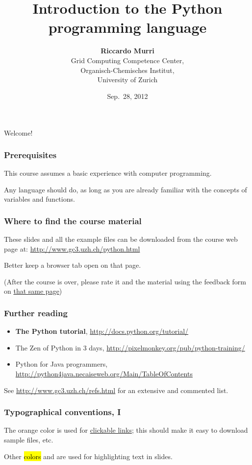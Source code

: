 \documentclass[english,serif,mathserif,xcolor=pdftex,dvipsnames,table]{beamer}
\title[Introduction]{%
  Introduction to the Python programming language
}
\author[R. Murri]{%
  \textbf{Riccardo Murri} \\
  Grid Computing Competence Center, \\
  Organisch-Chemisches Institut, \\
  University of Zurich
}
\date{Sep.~28, 2012}
\begin{document}
\maketitle

\begin{frame}
  \begin{center}
    {\Huge Welcome!}
  \end{center}
\end{frame}


\begin{frame}
  \frametitle{Prerequisites}
  This course assumes a basic experience with computer programming.

  \+ 
  Any language should do, as long as you are already familiar with
  the concepts of variables and functions.
\end{frame}


\begin{frame}
  \frametitle{Where to find the course material}

  These slides and all the example files can be downloaded from the
  course web page at: 
  {\small\url{http://www.gc3.uzh.ch/python.html}}

  \+
  Better keep a browser tab open on that page.

  \+ 
  (After the course is over, please rate it and the material using
  the feedback form on \href{http://www.gc3.uzh.ch/python.html}{that
    same page})
\end{frame}


\begin{frame}
  \frametitle{Further reading} 

  \begin{itemize}
    \item \textbf{The Python tutorial},
      {\small \url{http://docs.python.org/tutorial/}}
    \item {The Zen of Python in 3 days},
      {\small \url{http://pixelmonkey.org/pub/python-training/}}
    \item {Python for Java programmers}, 
      {\small \url{http://python4java.necaiseweb.org/Main/TableOfContents}}
  \end{itemize}

  \+
  See {\small\url{http://www.gc3.uzh.ch/refs.html}}
  for an extensive and commented list.

\end{frame}


\begin{frame}
  \frametitle{Typographical conventions, I}

  The orange color is used for
  \href{http://www.gc3.uzh.ch/python.html}{clickable
    links}; this should make it easy to download sample files, etc.

  \+ 
  Other \hl{colors} and  are used for highlighting
  text in slides.
\end{frame}
\end{document}
